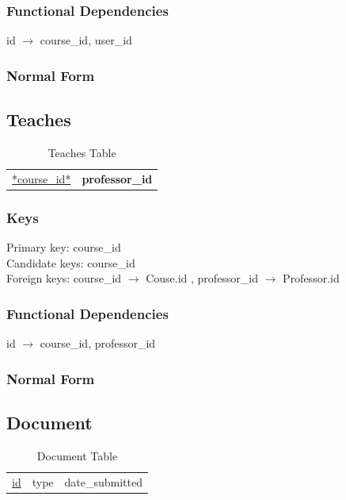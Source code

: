 \documentclass[11pt]{article}
\begin{document}
\subsubsection{Functional Dependencies}
\label{sec-3-6-2}


    id $\rightarrow$ course\_id, user\_id
\subsubsection{Normal Form}
\label{sec-3-6-3}
\subsection{Teaches}
\label{sec-3-7}


\begin{table}[htb]
\caption{Teaches Table} 
\begin{center}
\begin{tabular}{ll}
 \underline{*course\_id*}  &  \textbf{professor\_id}  \\
\end{tabular}
\end{center}
\end{table}
\subsubsection{Keys}
\label{sec-3-7-1}

    
    Primary key: course\_id\\    
    Candidate keys: course\_id\\
    Foreign keys: course\_id $\rightarrow$ Couse.id , professor\_id $\rightarrow$ Professor.id
\subsubsection{Functional Dependencies}
\label{sec-3-7-2}


    id $\rightarrow$ course\_id, professor\_id
\subsubsection{Normal Form}
\label{sec-3-7-3}
\subsection{Document}
\label{sec-3-8}


\begin{table}[htb]
\caption{Document Table} 
\begin{center}
\begin{tabular}{lll}
 \underline{id}  &  type  &  date\_submitted  \\
\end{tabular}
\end{center}
\end{table}
\end{document}
